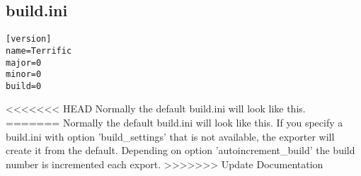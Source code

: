 \subsection{build.ini}

\begin{verbatim}
[version]
name=Terrific
major=0
minor=0
build=0
\end{verbatim}
<<<<<<< HEAD
\noindent Normally the default build.ini will look like this.
=======
\noindent Normally the default build.ini will look like this. If you specify a build.ini with option 'build\_settings' that is not available, the exporter will create it from the default. Depending on option 'autoincrement\_build' the build number is incremented each export.
>>>>>>> Update Documentation
